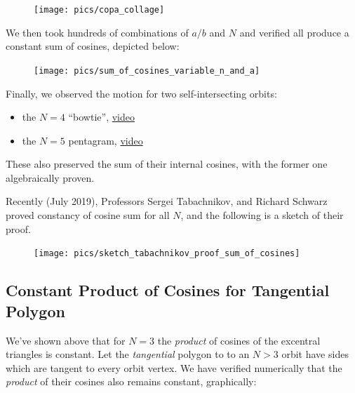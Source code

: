 \documentclass[]{article}
\providecommand{\tightlist}{%
  \setlength{\itemsep}{0pt}\setlength{\parskip}{0pt}}
\begin{document}
\begin{figure}[H]

{\centering \texttt{[image: pics/copa\_collage]} 

}

\end{figure}

We then took hundreds of combinations of \(a/b\) and \(N\) and verified all produce a constant sum of cosines, depicted below:

\begin{figure}[H]

{\centering \texttt{[image: pics/sum\_of\_cosines\_variable\_n\_and\_a]} 

}

\end{figure}

Finally, we observed the motion for two self-intersecting orbits:

\begin{itemize}
\tightlist
\item
  the \(N=4\) ``bowtie'', \href{https://youtu.be/cCYxN7ueGV4}{video}
\item
  the \(N=5\) pentagram, \href{https://youtu.be/ECe4DptduJY}{video}
\end{itemize}

These also preserved the sum of their internal cosines, with the former one algebraically proven.

Recently (July 2019), Professors Sergei Tabachnikov, and Richard Schwarz proved constancy of cosine sum for all \(N\), and the following is a sketch of their proof.

\begin{figure}[H]

{\centering \texttt{[image: pics/sketch\_tabachnikov\_proof\_sum\_of\_cosines]} 

}

\end{figure}

\hypertarget{constant-product-of-cosines-for-tangential-polygon}{%
\subsection{Constant Product of Cosines for Tangential Polygon}\label{constant-product-of-cosines-for-tangential-polygon}}

We've shown above that for \(N=3\) the \emph{product} of cosines of the excentral triangles is constant. Let the \emph{tangential} polygon to to an \(N>3\) orbit have sides which are tangent to every orbit vertex. We have verified numerically that the \emph{product} of their cosines also remains constant, graphically:
\end{document}
